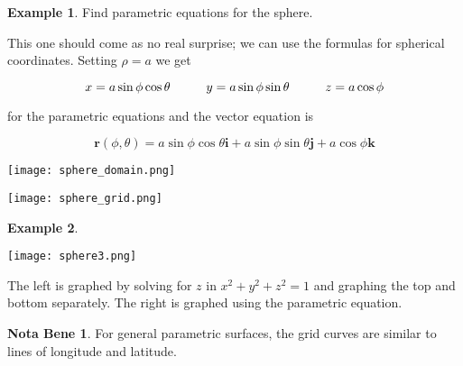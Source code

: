 \documentclass[11pt,oneside,english]{amsart}
\theoremstyle{definition}
\newtheorem*{example}{Example}
\newtheorem*{note}{Nota Bene}
\newcommand{\pspace}{\hspace{10mm}}
\begin{document}
\pagebreak

\begin{example}
Find parametric equations for the sphere.

This one should come as no real surprise; we can use the formulas for spherical coordinates. Setting $\rho=a$ we get

\[
x=a\sin\phi\cos\theta\pspace y=a\sin\phi\sin\theta \pspace z=a\cos\phi
\]

for the parametric equations and the vector equation is

\[
\mathbf{r}(\phi,\theta)=a\sin\phi\cos\theta\mathbf{i}+a\sin\phi\sin\theta\mathbf{j}+a\cos\phi\mathbf{k}
\]

\begin{minipage}{0.5\textwidth}
\begin{center}
\texttt{[image: sphere\_domain.png]}
\end{center}
\end{minipage}%
\begin{minipage}{0.5\textwidth}
\begin{center}
\texttt{[image: sphere\_grid.png]}
\end{center}
\end{minipage}

\end{example}

\vspace{6mm}
\begin{example}$ $

\begin{center}
\texttt{[image: sphere3.png]}
\end{center}

The left is graphed by solving for $z$ in $x^2+y^2+z^2=1$ and graphing the top and bottom separately. The right is graphed using the parametric equation.
\end{example}

\begin{note}
For general parametric surfaces, the grid curves are similar to lines of longitude and latitude.
\end{note}


\pagebreak
\end{document}
